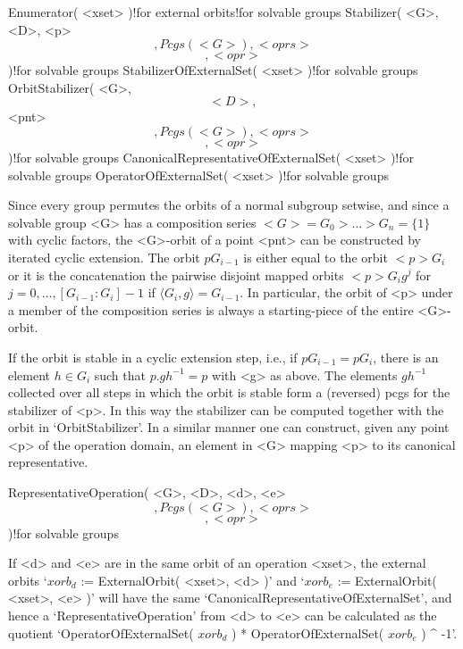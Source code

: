 \>Enumerator( <xset> )!{for external orbits!for solvable groups}
\>Stabilizer( <G>, <D>, <p> \[, {Pcgs( <G> )}, <oprs> \] \[, <opr> \]
)!{for solvable groups}
\>StabilizerOfExternalSet( <xset> )!{for solvable groups}
\>OrbitStabilizer( <G>, \[ <D>, \] <pnt> \[, {Pcgs( <G> )}, <oprs> \] \[,
<opr> \] )!{for solvable groups}
\>CanonicalRepresentativeOfExternalSet( <xset> )!{for solvable groups}
\>OperatorOfExternalSet( <xset> )!{for solvable groups}

\danger    Since every group permutes   the  orbits of  a normal subgroup
setwise, and since  a solvable group <G> has  a composition series $<G> =
G_0 > \ldots  > G_n=\{1\}$ with cyclic  factors, the <G>-orbit of a point
<pnt> can  be  constructed by iterated  cyclic   extension. The  orbit $p
G_{i-1}$ is   either  equal  to the   orbit   $<p>  G_i$  or it    is the
concatenation  the pairwise   disjoint  mapped orbits   $<p>  G_ig^j$ for
$j=0,\ldots, [G_{i-1}:G_i] - 1$ if  $\langle G_i, g\rangle = G_{i-1}$. In
particular, the orbit of <p> under a  member of the composition series is
always a starting-piece of the entire <G>-orbit.

If the orbit is stable in a cyclic extension step,  i.e., if $p G_{i-1} =
p G_i$, there is an element $h\in G_i$ such that $p.gh^{-1} = p$ with <g>
as above. The  elements $gh^{-1}$ collected over  all steps  in which the
orbit is stable form a (reversed) pcgs for the stabilizer of <p>. In this
way the    stabilizer  can be   computed together    with   the orbit  in
`OrbitStabilizer'. In a similar manner one can construct, given any point
<p> of   the operation domain,  an   element in  <G> mapping <p>   to its
canonical representative.

\>RepresentativeOperation( <G>, <D>, <d>, <e> \[, {Pcgs( <G> )}, <oprs>
\] \[, <opr> \] )!{for solvable groups}

If <d> and <e> are in the same orbit of an operation <xset>, the external
orbits `$xorb_d$    := ExternalOrbit( <xset>,  <d>   )'  and `$xorb_e$ :=
ExternalOrbit(      <xset>,     <e>    )'     will     have    the   same
`CanonicalRepresentativeOfExternalSet',        and    hence             a
`RepresentativeOperation'  from   <d> to <e>   can be  calculated  as the
quotient `OperatorOfExternalSet(  $xorb_d$  )    * OperatorOfExternalSet(
$xorb_e$ ) ^ -1'.

